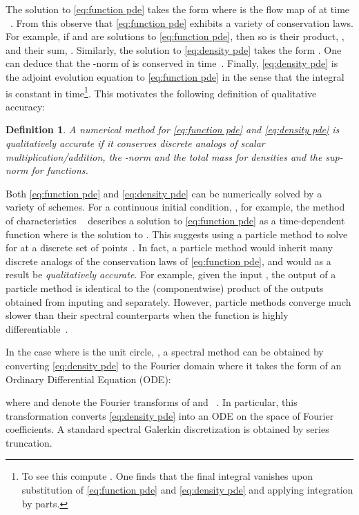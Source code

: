 \documentclass[final,leqno]{amsart}
\newtheorem{definition}[theorem]{Definition}
\begin{document}
The solution to \eqref{eq:function pde} takes the form 
where  is the flow map of  at time  ~\cite[Chapter 18]{Lee2006}.
From this observe that \eqref{eq:function pde} exhibits a variety of conservation laws.
For example, if  and  are solutions to \eqref{eq:function pde},
then so is their product, , and their sum, .
Similarly, the solution to \eqref{eq:density pde} takes the form .
One can deduce that the -norm of  is conserved in time~\cite[Theorem 16.42]{Lee2006}.
Finally, \eqref{eq:density pde} is the adjoint evolution equation to \eqref{eq:function pde} in the sense that the integral  is constant in time\footnote{To see this compute
.  One finds that the final integral vanishes upon substitution of \eqref{eq:function pde} and \eqref{eq:density pde} and applying integration by parts.}.
This motivates the following definition of qualitative accuracy:

\begin{definition} \label{def:quality}
	    A numerical method for \eqref{eq:function pde} and \eqref{eq:density pde} is \emph{qualitatively accurate} if it conserves discrete analogs of scalar multiplication/addition, the -norm and the total mass for densities and the sup-norm for functions.
\end{definition}

Both \eqref{eq:function pde} and \eqref{eq:density pde} can be numerically solved by a variety of schemes.
For a continuous initial condition, , for example, the method of characteristics ~\cite{Evans2010,MTA} describes a solution to \eqref{eq:function pde} as a time-dependent function  where  is the solution to .
This suggests using a particle method to solve for  at a discrete set of points~\cite{Leveque1992}.
 In fact, a particle method would inherit many discrete analogs of the conservation laws of \eqref{eq:function pde}, and would as a result be \emph{qualitatively accurate}.
For example, given the input , the output of a particle method is identical to the (componentwise) product of the outputs obtained from inputing  and  separately.
However, particle methods converge much slower than their spectral counterparts when the function  is highly differentiable~\cite{Boyd2001,Gottlieb2001}.

In the case where  is the unit circle, , a spectral method can be obtained by converting \eqref{eq:density pde} to the Fourier domain where it takes the form
of an Ordinary Differential Equation (ODE):

where  and  denote the Fourier transforms of  and  ~\cite{Taylor1974}.
In particular, this transformation converts \eqref{eq:density pde} into an ODE on the space of Fourier coefficients.
A standard spectral Galerkin discretization is obtained by series truncation. 
\end{document}
